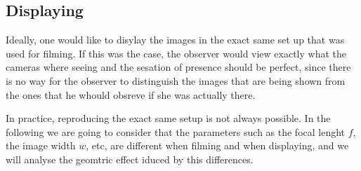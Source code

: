 \documentclass[12pt,a4paper]{article}
\begin{document}
\subsection{Displaying}
Ideally, one would like to disylay the images in the exact same set up that was used for filming.  If this was the case, the observer would view exactly what the cameras where seeing and the sesation of presence should be perfect, since there is no way for the observer to distinguish the images that are being shown from the ones that he whould obsreve if she was actually there.

In practice, reproducing the exact same setup is not always possible.  In the following we are going to consider that the parameters such as the focal lenght $f$, the image width $w$, etc, are different when filming and when displaying, and we will analyse the geomtric effect iduced by this differences.
\end{document}
